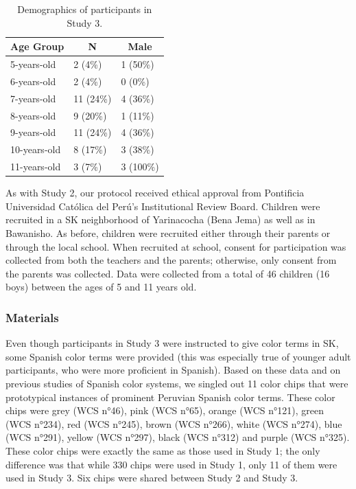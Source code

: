 \documentclass[
  english,
  ,man,floatsintext]{apa6}
\begin{document}
\begin{table}[tbp]

\begin{center}
\begin{threeparttable}

\caption{\label{tab:unnamed-chunk-5}Demographics of participants in Study 3.}

\begin{tabular}{lll}
\toprule
Age Group & \multicolumn{1}{c}{N} & \multicolumn{1}{c}{Male}\\
\midrule
5-years-old & 2 (4\%) & 1 (50\%)\\
6-years-old & 2 (4\%) & 0 (0\%)\\
7-years-old & 11 (24\%) & 4 (36\%)\\
8-years-old & 9 (20\%) & 1 (11\%)\\
9-years-old & 11 (24\%) & 4 (36\%)\\
10-years-old & 8 (17\%) & 3 (38\%)\\
11-years-old & 3 (7\%) & 3 (100\%)\\
\bottomrule
\end{tabular}

\end{threeparttable}
\end{center}

\end{table}

As with Study 2, our protocol received ethical approval from Pontificia Universidad Católica del Perú's Institutional Review Board. Children were recruited in a SK neighborhood of Yarinacocha (Bena Jema) as well as in Bawanisho. As before, children were recruited either through their parents or through the local school. When recruited at school, consent for participation was collected from both the teachers and the parents; otherwise, only consent from the parents was collected. Data were collected from a total of 46 children (16 boys) between the ages of 5 and 11 years old.

\hypertarget{materials-1}{%
\subsubsection{Materials}\label{materials-1}}

Even though participants in Study 3 were instructed to give color terms in SK, some Spanish color terms were provided (this was especially true of younger adult participants, who were more proficient in Spanish). Based on these data and on previous studies of Spanish color systems, we singled out 11 color chips that were prototypical instances of prominent Peruvian Spanish color terms. These color chips were grey (WCS n°46), pink (WCS n°65), orange (WCS n°121), green (WCS n°234), red (WCS n°245), brown (WCS n°266), white (WCS n°274), blue (WCS n°291), yellow (WCS n°297), black (WCS n°312) and purple (WCS n°325). These color chips were exactly the same as those used in Study 1; the only difference was that while 330 chips were used in Study 1, only 11 of them were used in Study 3. Six chips were shared between Study 2 and Study 3.
\end{document}
